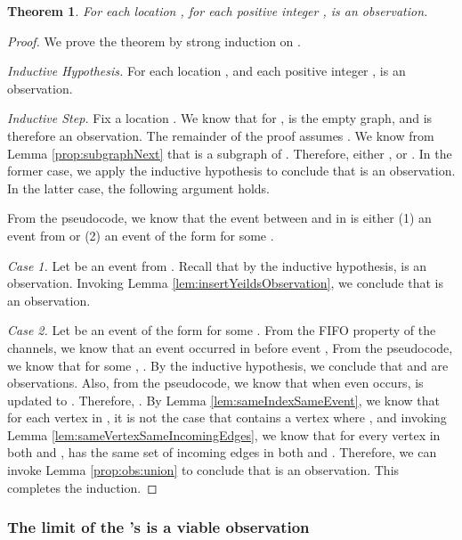 \documentclass[11pt]{article}
\newtheorem{theorem}{Theorem}
\numberwithin{theorem}{section}
\begin{document}
\begin{theorem}
\label{thm:GiIsObs}
For each location , for each positive integer ,  is an observation.
\end{theorem}
\begin{proof}
We prove the theorem by strong induction on .

\emph{Inductive Hypothesis.} For each location , and each positive integer ,  is an observation.

\emph{Inductive Step.} Fix a location . We know that for ,  is the empty graph, and is therefore an observation. The remainder of the proof assumes . We know from Lemma \ref{prop:subgraphNext} that  is a subgraph of . Therefore, either , or . In the former case, we apply the inductive hypothesis to conclude that  is an observation. In the latter case, the following argument holds.

From the pseudocode, we know that the event  between  and  in  is either (1) an event from  or (2) an event of the form  for some .

\emph{Case 1.} Let  be an event from . Recall that by the inductive hypothesis,  is an observation. Invoking Lemma \ref{lem:insertYeildsObservation}, we conclude that  is an observation.

\emph{Case 2.} Let  be an event of the form  for some . From the FIFO property of the channels, we know that an event  occurred in  before event , From the pseudocode, we know that for some , . By the inductive hypothesis, we conclude that  and  are observations. Also, from the pseudocode, we know that when even  occurs,  is updated to . Therefore,  . 
By Lemma \ref{lem:sameIndexSameEvent}, we know that for each vertex  in , it is not the case that  contains a vertex  where , and invoking Lemma \ref{lem:sameVertexSameIncomingEdges}, we know that for every vertex  in both  and ,  has the same set of incoming edges in both  and .
Therefore, we can invoke Lemma \ref{prop:obs:union} to conclude that  is an observation. This completes the induction.
\end{proof}










\subsubsection{The limit of the 's is a viable observation}
\label{subsubsec:proofLimitObsIsViable}
\end{document}
